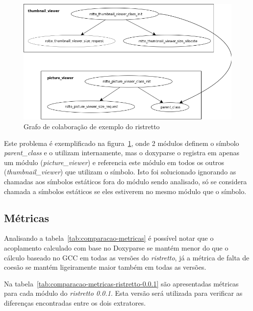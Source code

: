 \begin{figure}
\center
\includegraphics[scale=0.3]{imagens/doxyparse-erro-parent-class}
\caption{Grafo de colaboração de exemplo do ristretto}
\label{fig:doxyparse-erro}
\end{figure}

Este problema é exemplificado na figura~\ref{fig:doxyparse-erro}, onde 2
módulos definem o símbolo {\it parent\_class} e o utilizam internamente, mas o
doxyparse o registra em apenas um módulo ({\it picture\_viewer}) e referencia
este módulo em todos os outros ({\it thumbnail\_viewer}) que utilizam o
símbolo. Isto foi solucionado ignorando as chamadas aos símbolos estáticos fora
do módulo sendo analisado, só se considera chamada a símbolos estáticos se eles
estiverem no mesmo módulo que o símbolo.

\subsection{Métricas}

Analisando a tabela~\ref{tab:comparacao-metricas} é possível notar que o
acoplamento calculado com base no Doxyparse se mantém menor do que o cálculo
baseado no GCC em todas as versões do {\it ristretto}, já a métrica de falta de
coesão se mantém ligeiramente maior também em todas as versões.

Na tabela~\ref{tab:comparacao-metricas-ristretto-0.0.1} são apresentadas
métricas para cada módulo do {\it ristretto 0.0.1}. Esta versão será utilizada
para verificar as diferenças encontradas entre os dois extratores.

